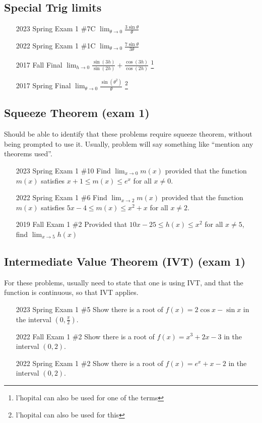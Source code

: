 \documentclass[10pt]{scrartcl}
\theoremstyle{definition}
\begin{document}
\subsection{Special Trig limits}
\begin{enumerate}
\item [2023 Spring Exam 1 \#7C] $\lim_{\theta\to0} \frac{3\sin \theta}{\theta}$
\item [2022 Spring Exam 1 \#1C] $\lim_{\theta\to0} \frac{7\sin \theta}{3 \theta}$
\item [2017 Fall Final] $\lim_{h\to 0} \frac{\sin(3h)}{\sin(2h)} + \frac{\cos(3h)}{\cos(2h)}$ \footnote{l'hopital can also be used for one of the terms}
\item [2017 Spring Final] $\lim_{\theta\to0} \frac{\sin(\theta^2)}{\theta}$ \footnote{l'hopital can also be used for this}
\end{enumerate}

\subsection{Squeeze Theorem (exam 1)}
Should be able to identify that these problems require squeeze theorem, without being prompted to use it.
Usually, problem will say something like ``mention any theorems used''.
\begin{enumerate}
\item [2023 Spring Exam 1 \#10] Find $\lim_{x\to0} m(x)$ provided that the function $m(x)$ satisfies $x+1 \le m(x) \le e^x$ for all $x \ne 0$.
\item [2022 Spring Exam 1 \#6] Find $\lim_{x\to2} m(x)$ provided that the function $m(x)$ satisfies $5x-4 \le m(x) \le x^2+x$ for all $x \ne 2$.
\item [2019 Fall Exam 1 \#2] Provided that $10x-25 \le h(x) \le x^2$ for all $x \ne 5$, find $\lim_{x\to5} h(x)$
\end{enumerate}

\subsection{Intermediate Value Theorem (IVT) (exam 1)}
For these problems, usually need to state that one is using IVT, and that the function is continuous, so that IVT applies.
\begin{enumerate}
\item [2023 Spring Exam 1 \#5] Show there is a root of $f(x) = 2\cos x - \sin x$ in the interval $(0, \frac\pi2)$.
\item [2022 Fall Exam 1 \#2] Show there is a root of $f(x) = x^3+2x-3$ in the interval $(0, 2)$.
\item [2022 Spring Exam 1 \#2] Show there is a root of $f(x) = e^x+x-2$ in the interval $(0, 2)$.
\end{enumerate}
\end{document}
